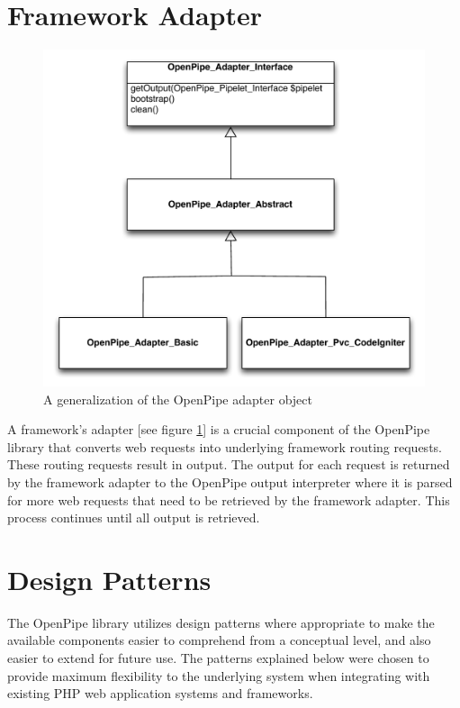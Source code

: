 \documentclass[12pt]{report}
\begin{document}
\section{Framework Adapter}

\begin{figure}[H]
\centering
\includegraphics[width=\textwidth,keepaspectratio]{figures/images/generalization_adapters.pdf}
\caption{A generalization of the OpenPipe adapter object}
\label{fig:generalizationAdapter}
\end{figure}

A framework's adapter [see figure \ref{fig:generalizationAdapter}]  is a crucial component of the OpenPipe library that converts web requests into underlying framework routing requests. These routing requests result in output. The output for each request is returned by the framework adapter to the OpenPipe output interpreter where it is parsed for more web requests that need to be retrieved by the framework adapter. This process continues until all output is retrieved.


\section{Design Patterns}
The OpenPipe library utilizes design patterns where appropriate to make the available components easier to comprehend from a conceptual level, and also easier to extend for future use. The patterns explained below were chosen to provide maximum flexibility to the underlying system when integrating with existing PHP web application systems and frameworks.
\end{document}

